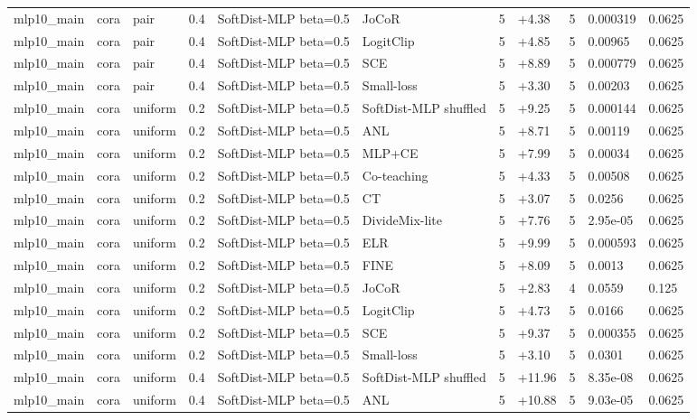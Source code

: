 \begin{table}[t]
\begin{tabular}{llllllrlrll}
mlp10_main & cora & pair & 0.4 & SoftDist-MLP beta=0.5 & JoCoR & 5 & +4.38 & 5 & 0.000319 & 0.0625 \\
mlp10_main & cora & pair & 0.4 & SoftDist-MLP beta=0.5 & LogitClip & 5 & +4.85 & 5 & 0.00965 & 0.0625 \\
mlp10_main & cora & pair & 0.4 & SoftDist-MLP beta=0.5 & SCE & 5 & +8.89 & 5 & 0.000779 & 0.0625 \\
mlp10_main & cora & pair & 0.4 & SoftDist-MLP beta=0.5 & Small-loss & 5 & +3.30 & 5 & 0.00203 & 0.0625 \\
mlp10_main & cora & uniform & 0.2 & SoftDist-MLP beta=0.5 & SoftDist-MLP shuffled & 5 & +9.25 & 5 & 0.000144 & 0.0625 \\
mlp10_main & cora & uniform & 0.2 & SoftDist-MLP beta=0.5 & ANL & 5 & +8.71 & 5 & 0.00119 & 0.0625 \\
mlp10_main & cora & uniform & 0.2 & SoftDist-MLP beta=0.5 & MLP+CE & 5 & +7.99 & 5 & 0.00034 & 0.0625 \\
mlp10_main & cora & uniform & 0.2 & SoftDist-MLP beta=0.5 & Co-teaching & 5 & +4.33 & 5 & 0.00508 & 0.0625 \\
mlp10_main & cora & uniform & 0.2 & SoftDist-MLP beta=0.5 & CT & 5 & +3.07 & 5 & 0.0256 & 0.0625 \\
mlp10_main & cora & uniform & 0.2 & SoftDist-MLP beta=0.5 & DivideMix-lite & 5 & +7.76 & 5 & 2.95e-05 & 0.0625 \\
mlp10_main & cora & uniform & 0.2 & SoftDist-MLP beta=0.5 & ELR & 5 & +9.99 & 5 & 0.000593 & 0.0625 \\
mlp10_main & cora & uniform & 0.2 & SoftDist-MLP beta=0.5 & FINE & 5 & +8.09 & 5 & 0.0013 & 0.0625 \\
mlp10_main & cora & uniform & 0.2 & SoftDist-MLP beta=0.5 & JoCoR & 5 & +2.83 & 4 & 0.0559 & 0.125 \\
mlp10_main & cora & uniform & 0.2 & SoftDist-MLP beta=0.5 & LogitClip & 5 & +4.73 & 5 & 0.0166 & 0.0625 \\
mlp10_main & cora & uniform & 0.2 & SoftDist-MLP beta=0.5 & SCE & 5 & +9.37 & 5 & 0.000355 & 0.0625 \\
mlp10_main & cora & uniform & 0.2 & SoftDist-MLP beta=0.5 & Small-loss & 5 & +3.10 & 5 & 0.0301 & 0.0625 \\
mlp10_main & cora & uniform & 0.4 & SoftDist-MLP beta=0.5 & SoftDist-MLP shuffled & 5 & +11.96 & 5 & 8.35e-08 & 0.0625 \\
mlp10_main & cora & uniform & 0.4 & SoftDist-MLP beta=0.5 & ANL & 5 & +10.88 & 5 & 9.03e-05 & 0.0625 \\

\end{tabular}
\end{table}
